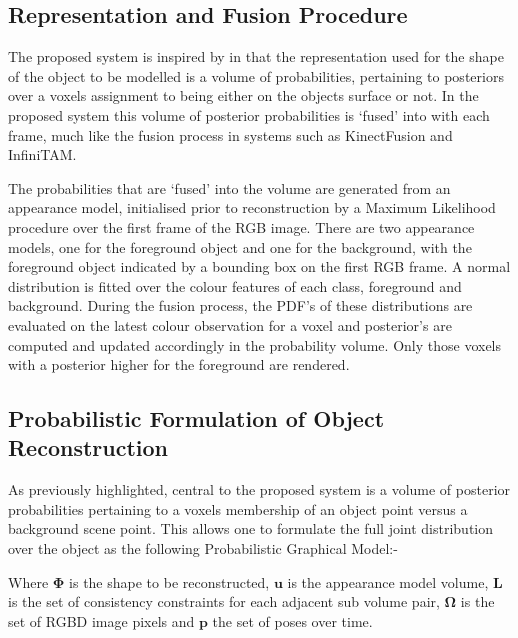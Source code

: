 \subsection{Representation and Fusion Procedure}
The proposed system is inspired by\cite{Kolev2006} in that the representation used for the shape of the object to be modelled is a volume 
of probabilities, pertaining to posteriors over a voxels assignment to being either on the objects surface or not. In the proposed system this 
volume of posterior probabilities is `fused' into with each frame, much like the fusion process in systems such as KinectFusion\cite{Newcombe2011} 
and InfiniTAM\cite{Prisacariu2014}.

The probabilities that are `fused' into the volume are generated from an appearance model, initialised prior to reconstruction by a Maximum 
Likelihood procedure over the first frame of the RGB image. There are two appearance models, one for the foreground object and one for 
the background, with the foreground object indicated by a bounding box on the first RGB frame. A normal distribution is fitted over the colour 
features of each class, foreground and background. During the fusion process, the PDF's of these distributions are evaluated on the latest 
colour observation for a voxel and posterior's are computed and updated accordingly in the probability volume. Only those voxels with a 
posterior higher for the foreground are rendered.

\subsection{Probabilistic Formulation of Object Reconstruction}
As previously highlighted, central to the proposed system is a volume of posterior probabilities pertaining to a voxels membership of an object 
point versus a background scene point. This allows one to formulate the full joint distribution over the object as the following Probabilistic 
Graphical Model:-
\iffalse
\begin{figure}[h]
	\centering
	\tikz{
		\node[latent] (phi) {$\mathbf{\Phi}$};
		\node[latent, right=of phi] (u) {$\mathbf{u}$};
		\node[latent, below=of u] (L) {$\mathbf{L}$};
		\node[latent, right=of u, yshift=-1cm] (omega) {$\mathbf{\Omega}$};
		\node[latent, right=of u, yshift=1cm] (p) {$\mathbf{p}$};
		
		\plate[inner sep=0.25cm] {plate1} {(omega) (p)} {t, p};
		\plate[inner sep=0.25cm] {plate2} {(u)} {v};
		\plate[inner sep=0.25cm] {plate3} {(L)} {(s, s')};
		
		\edge {omega, p} {u, L}
		\edge {L} {u}
		\edge {u} {phi}
	}
\end{figure}
\fi
Where $\mathbf{\Phi}$ is the shape to be reconstructed, $\mathbf{u}$ is the appearance model volume, $\mathbf{L}$ is the 
set of consistency constraints for each adjacent sub volume pair, $\mathbf{\Omega}$ is the set of RGBD image pixels and $\mathbf{p}$ the 
set of poses over time.

